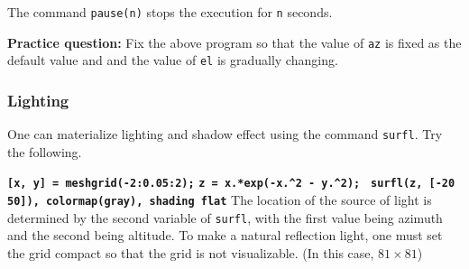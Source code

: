 \vv The command {\tt pause(n)} stops the execution for {\tt n} seconds.

\vn \textbf{Practice question:} Fix the above program so that the value of {\tt az} is fixed as the default value and and the value of {\tt el} is gradually changing.

\subsubsection{Lighting}
One can materialize lighting and shadow effect using the command {\tt surfl}. Try the following.

\matlabp\texttt{\textbf{[x, y] = meshgrid(-2:0.05:2);}}
\matlabp\texttt{\textbf{z = x.*exp(-x.\^{}2 - y.\^{}2); }}
\matlabp\texttt{\textbf{surfl(z, [-20 50]), colormap(gray),
shading flat}} \vn The location of the source of light is determined by the second variable of {\tt surfl}, with the first value being azimuth and the second being altitude. To make a natural reflection light, one must set the grid compact so that the grid is not visualizable. (In this case, $81\times 81$)